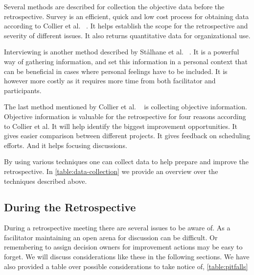 \documentclass[12pt]{article}
\begin{document}
Several methods are described for collection the objective data before the retrospective. Survey is an efficient, quick and low cost process for obtaining data according to Collier et al. ~\cite{Collier1996}. It helps establish the scope for the retrospective and severity of different issues. It also returns quantitative data for organizational use.

Interviewing is another method described by Stålhane et al. ~\cite{Birk2002}. It is a powerful way of gathering information, and set this information in a personal context that can be beneficial in cases where personal feelings have to be included. It is however more costly as it requires more time from both facilitator and participants. 

The last method mentioned by Collier et al. ~\cite{Collier1996} is collecting objective information. Objective information is valuable for the retrospective for four reasons according to Collier et al. It will help identify the biggest improvement opportunities. It gives easier comparison between different projects. It gives feedback on scheduling efforts. And it helps focusing discussions. 

By using various techniques one can collect data to help prepare and improve the retrospective. In \autoref{table:data-collection} we provide an overview over the techniques described above. 

\begin{table}[!h]
	\centering
	\captionsetup{justification=centering}
	\caption{Techniques for collecting data before a retrospective}
	\label{table:data-collection}
\end{table}

\subsection{During the Retrospective}
During a retrospective meeting there are several issues to be aware of. As a facilitator maintaining an open arena for discussion can be difficult. Or remembering to assign decision owners for improvement actions may be easy to forget. We will discuss considerations like these  in the following sections. We have also provided a table over possible considerations to take notice of, \autoref{table:pitfalls}
\end{document}
